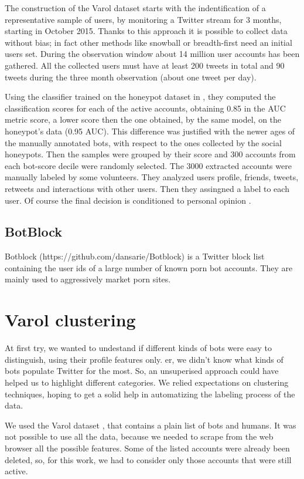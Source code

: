 The construction of the Varol dataset starts with the indentification of a representative sample of users, by monitoring a Twitter stream for 3 months, starting in October 2015. Thanks to this approach it is possible to collect data without bias; in fact other methods like snowball or breadth-first need an initial users set.
During the observation window about 14 million user accounts has been gathered. 
All the collected users must have at least 200 tweets in total and 90 tweets during the three month observation (about one tweet per day).

Using the classifier trained on the honeypot dataset in \cite{Lee11sevenmonths}, they computed the classification scores for each of the active accounts, obtaining 0.85 in the AUC metric score, a lower score then the one obtained, by the same model, on the honeypot's data (0.95 AUC). This difference was justified with the newer ages of the manually annotated bots, with respect to the ones collected by the social honeypots.
Then the samples were grouped by their score and 300 accounts from each bot-score decile were randomly selected. 
The 3000 extracted accounts were manually labeled by some volunteers. They analyzed users profile, friends, tweets, retweets and interactions with other users. Then they assingned a label to each user.
Of course the final decision is conditioned to personal opinion \cite{Varol}.

\subsection{BotBlock}
Botblock (https://github.com/dansarie/Botblock) is a Twitter block list containing the user ids of a large number of known porn bot accounts.
They are mainly used to aggressively market porn sites.

\section{Varol clustering}
At first try, we wanted to undestand if different kinds of bots were easy to distinguish, using their profile features only. er, we didn't know what kinds of bots populate Twitter for the most. So, an unsuperised approach could have helped us to highlight different categories. We relied expectations on clustering techniques, hoping to get a solid help in automatizing the labeling process of the data.

We used the Varol dataset \cite{Varol}, that contains a plain list of bots and humans.
It was not possible to use all the data, because we needed to scrape from the web browser all the possible features. Some of the listed accounts were already been deleted, so, for this work, we had to consider only those accounts that were still active.


